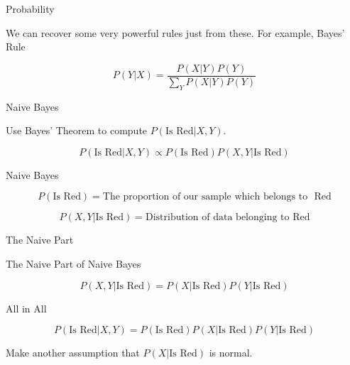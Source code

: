 \documentclass[12pt,ignorenonframetext,]{beamer}
\begin{document}
\begin{frame}{Probability}
\protect\hypertarget{probability-2}{}

We can recover some very powerful rules just from these. For example,
Bayes' Rule

\[P(Y|X) = \dfrac{P(X|Y)P(Y)}{\displaystyle{\sum_Y} P(X|Y)P(Y) }\]

\end{frame}

\begin{frame}{Naive Bayes}
\protect\hypertarget{naive-bayes}{}

Use Bayes' Theorem to compute \(P(\mbox{Is Red}|X,Y)\).

\[P(\mbox{Is Red}|X,Y) \propto P(\mbox{Is Red})P(X,Y|\mbox{Is Red})\]

\end{frame}

\begin{frame}{Naive Bayes}
\protect\hypertarget{naive-bayes-1}{}

\[P(\mbox{Is Red}) = \mbox{The proportion of our sample which belongs to } \mbox{ Red} \]

\[P(X,Y|\mbox{Is Red}) = \mbox{Distribution of data belonging to } \mbox{Red}\]

\end{frame}

\begin{frame}{The Naive Part}
\protect\hypertarget{the-naive-part}{}

The Naive Part of Naive Bayes

\[P(X,Y|\mbox{Is Red}) = P(X \vert \mbox{Is Red})P(Y\vert \mbox{Is Red})\]

\end{frame}

\begin{frame}{All in All}
\protect\hypertarget{all-in-all}{}

\[P(\mbox{Is Red}|X,Y) = P(\mbox{Is Red})P(X \vert \mbox{Is Red})P(Y\vert\mbox{Is Red})\]

Make another assumption that \(P(X \vert \mbox{Is Red})\) is normal.

\end{frame}
\end{document}
